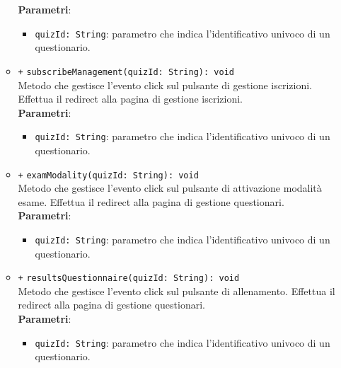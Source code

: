 \begin{itemize}
\begin{itemize}
		\textbf{Parametri}:  
		\begin{itemize}
			\item \texttt{quizId: String}: parametro che indica l'identificativo univoco di un questionario.
		\end{itemize}
		\item \texttt{+} \texttt{subscribeManagement(quizId: String): void} \\
		Metodo che gestisce l'evento click sul pulsante di gestione iscrizioni. Effettua il redirect alla pagina di gestione iscrizioni. \\
		\textbf{Parametri}:
		\begin{itemize}
			\item \texttt{quizId: String}: parametro che indica l'identificativo univoco di un questionario.
		\end{itemize}
		\item \texttt{+} \texttt{examModality(quizId: String): void} \\Metodo che gestisce l'evento click sul pulsante di attivazione modalità esame. Effettua il redirect alla pagina di gestione questionari. \\
		\textbf{Parametri}:
		\begin{itemize}
			\item \texttt{quizId: String}: parametro che indica l'identificativo univoco di un questionario.
		\end{itemize}
		\item \texttt{+} \texttt{resultsQuestionnaire(quizId: String): void} \\
		Metodo che gestisce l'evento click sul pulsante di allenamento. Effettua il redirect alla pagina di gestione questionari. \\
		\textbf{Parametri}:
		\begin{itemize}
			\item \texttt{quizId: String}: parametro che indica l'identificativo univoco di un questionario.
		\end{itemize}   
	\end{itemize}
\end{itemize}